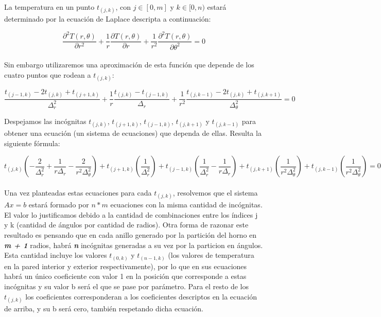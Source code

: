 La temperatura en un punto $t_{(j,k)}$, con $j \in [0, m]$ y $k \in [0, n)$ estará determinado por la ecuación de Laplace descripta a continuación:


$$ \frac{\partial^{2}T(r,\theta)}{\partial r^{2}} + \frac{1}{r} \frac{\partial T(r,\theta)}{\partial r} + \frac{1}{r^{2}} \frac{\partial^{2}T(r,\theta)}{\partial \theta^{2}} = 0$$\\

Sin embargo utilizaremos una aproximación de esta función que depende de los cuatro puntos que rodean a $t_{(j,k)}$:


$$ \frac{t_{(j-1,k)} - 2t_{(j,k)} + t_{(j+1,k)}}{\Delta_{r} ^{2}} + \frac{1}{r} \frac{t_{(j,k)} - t_{(j-1,k)}}{\Delta_{r}} + \frac{1}{r^{2}} \frac{t_{(j,k-1)} - 2t_{(j,k)} + t_{(j,k+1)}}{\Delta_{\theta} ^{2}} = 0$$

Despejamos las incógnitas $t_{(j,k)}$, $t_{(j+1,k)}$, $t_{(j-1,k)}$, $t_{(j,k+1)}$ y $t_{(j,k-1)}$ para obtener una ecuación (un sistema de ecuaciones) que dependa de ellas. Resulta la siguiente fórmula:



$$  t_{(j,k)} (-\frac{2}{\Delta^2_r}+\frac{1}{r \Delta_r}-\frac{2}{r^2 \Delta^2_\theta}) + t_{(j+1,k)} (\frac{1}{\Delta^2_r}) + t_{(j-1,k)} (\frac{1}{\Delta^2_r}-\frac{1}{r \Delta_r}) + t_{(j,k+1)} (\frac{1}{r^2 \Delta^2_\theta}) + t_{(j,k-1)} (\frac{1}{r^2 \Delta^2_\theta}) = 0$$ \\


Una vez planteadas estas ecuaciones para cada $ t_{(j,k)} $, resolvemos que el sistema $Ax = b$ estará formado por $n*m$ ecuaciones con la misma cantidad de incógnitas. El valor lo justificamos debido a la cantidad de combinaciones entre los índices j y k (cantidad de ángulos por cantidad de radios). Otra forma de razonar este resultado es pensando que en cada anillo generado por la partición del horno en \textbf{\textit{m + 1}} radios, habrá \textbf{\textit{n}} incógnitas generadas a su vez por la particion en ángulos. \\
Esta cantidad incluye los valores $t_{(0,k)}$ y $t_{(n-1,k)}$ (los valores de temperatura en la pared interior y exterior respectivamente), por lo que en sus ecuaciones habrá un único coeficiente con valor 1 en la posición que corresponde a estas incógnitas y su valor b será el que se pase por parámetro. Para el resto de los $t_{(j,k)}$ los coeficientes corresponderan a los coeficientes descriptos en la ecuación de arriba, y su b será cero, también respetando dicha ecuación.

